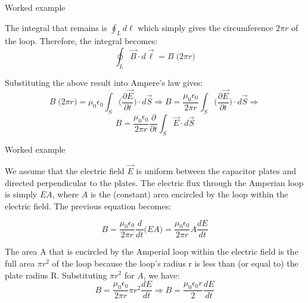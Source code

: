 {\begin{frame}{Worked example }
\vspace{0.2cm}

The integral that remains is $\oint_{L}  d\ell$ which simply gives the circumference $2 \pi r$ of the loop.
Therefore, the integral becomes:
\begin{equation*}
    \oint_{L} \vec{B} \cdot d\vec{\ell} = B \; \Big( 2 \pi r\Big)
\end{equation*}

\vspace{0.2cm}

Substituting the above result into Ampere's law gives:
\begin{equation*}
    B \; \Big( 2 \pi r\Big) = \mu_0 \epsilon_0 \int_{S} \Big( \frac{\partial \vec{E}}{\partial t} \Big) \cdot d\vec{S} \Rightarrow
    B = \frac{\mu_0 \epsilon_0}{2 \pi r} \int_{S} \Big( \frac{\partial \vec{E}}{\partial t} \Big) \cdot d\vec{S} \Rightarrow
\end{equation*}
\begin{equation*}
    B = \frac{\mu_0 \epsilon_0}{2 \pi r}  \frac{\partial}{\partial t} \int_{S} \vec{E} \cdot d\vec{S}
\end{equation*}

\end{frame}

%
%
%

\begin{frame}{Worked example }

We assume that the electric field $\vec{E}$ is uniform between the
capacitor plates and directed perpendicular to the plates.
The electric flux through the Amperian loop is simply $EA$,
where $A$ is the (constant) area encircled by the loop within the electric field.
The previous equation becomes:

\begin{equation*}
    B = \frac{\mu_0 \epsilon_0}{2 \pi r}  \frac{d}{dt} \Big( E A \Big)
       = \frac{\mu_0 \epsilon_0}{2 \pi r}  A \frac{dE}{dt}
\end{equation*}

\vspace{0.2cm}

The area A that is encircled by the Amperial loop within the electric field is
the full area $\pi r^2$ of the loop because the loop's radius r is less than (or equal to)
the plate radius R.   Substituting $\pi r^2$ for $A$, we have:
\begin{equation*}
    B = \frac{\mu_0 \epsilon_0}{2 \pi r}  \pi r^2 \frac{dE}{dt} \Rightarrow
    B = \frac{\mu_0 \epsilon_0 r}{2} \frac{dE}{dt}
\end{equation*}


\end{frame}}
